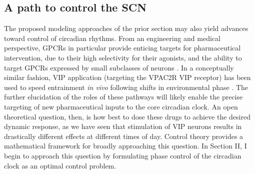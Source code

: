 \subsection*{A path to control the SCN}
The proposed modeling approaches of the prior section may also yield advances toward control of circadian rhythms.
From an engineering and medical perspective, GPCRs in particular provide enticing targets for pharmaceutical intervention, due to their high selectivity for their agonists, and the ability to target GPCRs expressed by small subclasses of neurons \cite{Klabunde2002,Okuno2008}.
In a conceptually similar fashion, VIP application (targeting the VPAC2R VIP receptor) has been used to speed entrainment \textit{in vivo} following shifts in environmental phase \cite{An2013}.
The further elucidation of the roles of these pathways will likely enable the precise targeting of new pharmaceutical inputs to the core circadian clock.
An open theoretical question, then, is how best to dose these drugs to achieve the desired dynamic response, as we have seen that stimulation of VIP neurons results in drastically different effects at different times of day.
Control theory provides a mathematical framework for broadly approaching this question.
In Section II, I begin to approach this question by formulating phase control of the circadian clock as an optimal control problem.

